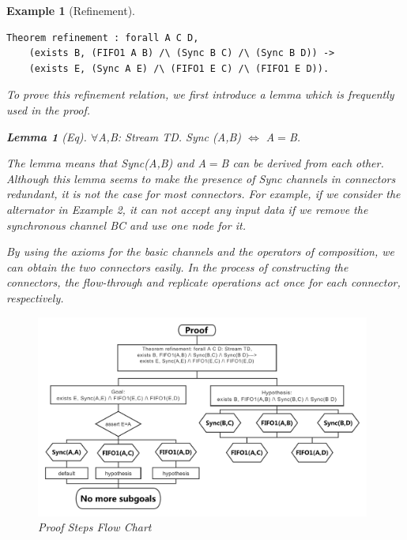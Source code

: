 \documentclass[3p,times]{elsarticle}
\newtheorem{example}{Example}[section]
\newtheorem{lemma}{Lemma}[section]
\begin{document}
\begin{example}[Refinement]
\begin{lstlisting}[language=coq]
    Theorem refinement : forall A C D,
    (exists B, (FIFO1 A B) /\ (Sync B C) /\ (Sync B D)) ->
    (exists E, (Sync A E) /\ (FIFO1 E C) /\ (FIFO1 E D)).
\end{lstlisting}



To prove this refinement relation, we first introduce a lemma which is frequently used in the proof.
\begin{lemma}[Eq]\label{lemma:eq}
$\forall$A,B: Stream TD.
  Sync (A,B) $\Leftrightarrow$ A$=$B.
\end{lemma}
The lemma means that \emph{Sync(A,B)} and \emph{A$=$B} can be derived
from each other. Although this lemma seems to make the presence of
Sync channels in connectors redundant, it is not the case for most
connectors. For example, if we consider
the alternator in Example 2, it can not accept any input data if we
remove the synchronous channel \emph{BC} and use one node for it.

By using the axioms for the basic channels and the operators of composition, we can obtain the two connectors easily.
In the process of constructing the connectors, the flow-through and replicate operations act once for each connector, respectively.


\begin{figure}[htbp]
\centering
\includegraphics[width=11cm]{Refinement.pdf}
\caption{Proof Steps Flow Chart}
\label{fig:equivalence}
\end{figure}


\end{example}
\end{document}
